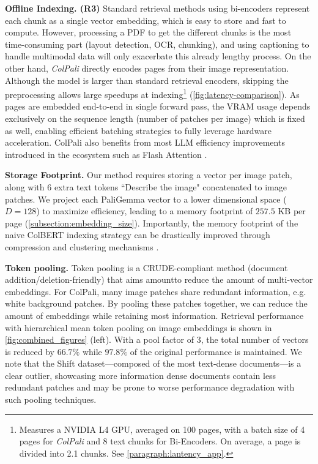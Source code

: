 \documentclass{article} %
\begin{document}
\noindent\textbf{Offline Indexing. (R3)} 
Standard retrieval methods using bi-encoders represent each chunk as a single vector embedding, which is easy to store and fast to compute. However, processing a PDF to get the different chunks is the most time-consuming part (layout detection, OCR, chunking), and using captioning to handle multimodal data will only exacerbate this already lengthy process. On the other hand, \textit{ColPali} directly encodes pages from their image representation. Although the model is larger than standard retrieval encoders, skipping the preprocessing allows large speedups at indexing\footnote{Measures a NVIDIA L4 GPU, averaged on 100 pages, with a batch size of 4 pages for \textit{ColPali} and 8 text chunks for Bi-Encoders. On average, a page is divided into 2.1 chunks. See \autoref{paragraph:lantency_app}.} (\autoref{fig:latency-comparison}). As pages are embedded end-to-end in single forward pass, the VRAM usage depends exclusively on the sequence length (number of patches per image) which is fixed as well, enabling efficient batching strategies to fully leverage hardware acceleration. ColPali also benefits from most LLM efficiency improvements introduced in the ecosystem such as Flash Attention \citep{dao2023flashattention2fasterattentionbetter}.

\noindent\textbf{Storage Footprint.} Our method requires storing a vector per image patch, along with 6 extra text tokens ``Describe the image" concatenated to image patches. We project each PaliGemma vector to a lower dimensional space ($D=128$) to maximize efficiency, leading to a memory footprint of $257.5$ KB per page (\autoref{subsection:embedding_size}). Importantly, the memory footprint of the naive ColBERT indexing strategy can be drastically improved through compression and clustering mechanisms \citep{santhanam_plaid_2022, clavie_reducing_2024}.

\noindent\textbf{Token pooling.}
Token pooling \citep{clavie_reducing_2024} is a CRUDE-compliant method (document addition/deletion-friendly) that aims amountto reduce the amount of multi-vector embeddings. For ColPali, many image patches share redundant information, e.g. white background patches. By pooling these patches together, we can reduce the amount of embeddings while retaining most information. Retrieval performance with hierarchical mean token pooling on image embeddings is shown in \autoref{fig:combined_figures} (left).
With a pool factor of 3, the total number of vectors is reduced by $66.7\%$ while $97.8\%$ of the original performance is maintained. We note that the Shift dataset—composed of the most text-dense documents—is a clear outlier, showcasing more information dense documents contain less redundant patches and may be prone to worse performance degradation with such pooling techniques.
\end{document}
